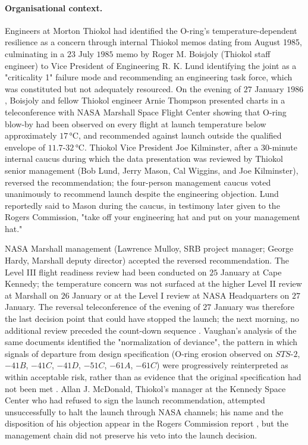\paragraph{Organisational context.}
Engineers at Morton Thiokol had identified the O-ring's
temperature-dependent resilience as a concern through internal
Thiokol memos dating from August 1985, culminating in a
$23$ July $1985$ memo by Roger M. Boisjoly (Thiokol staff
engineer) to Vice President of Engineering R. K. Lund identifying
the joint as a "criticality 1" failure mode and recommending an
engineering task force, which was constituted but not adequately
resourced. On the evening of $27$ January $1986$, Boisjoly and
fellow Thiokol engineer Arnie Thompson presented charts in a
teleconference with NASA Marshall Space Flight Center showing
that O-ring blow-by had been observed on every flight at launch
temperature below approximately $17\,\si{\degreeCelsius}$, and
recommended against launch outside the qualified envelope of
$11.7$-$32\,\si{\degreeCelsius}$. Thiokol Vice President Joe
Kilminster, after a $30$-minute internal caucus during which the
data presentation was reviewed by Thiokol senior management (Bob
Lund, Jerry Mason, Cal Wiggins, and Joe Kilminster), reversed the
recommendation; the four-person management caucus voted
unanimously to recommend launch despite the engineering
objection. Lund reportedly said to Mason during the caucus, in
testimony later given to the Rogers Commission, "take off your
engineering hat and put on your management hat."

NASA Marshall management (Lawrence Mulloy, SRB project manager;
George Hardy, Marshall deputy director) accepted the reversed
recommendation. The Level III flight readiness review had been
conducted on $25$ January at Cape Kennedy; the temperature
concern was not surfaced at the higher Level II review at
Marshall on $26$ January or at the Level I review at NASA
Headquarters on $27$ January. The reversal teleconference of the
evening of $27$ January was therefore the last decision point
that could have stopped the launch; the next morning, no
additional review preceded the count-down sequence
\cite{acc:nasa-challenger,hist:vaughan1996}. Vaughan's analysis
of the same documents identified the "normalization of deviance",
the pattern in which signals of departure from design
specification (O-ring erosion observed on $S T S$-$2$, $-41B$,
$-41C$, $-41D$, $-51C$, $-61A$, $-61C$) were progressively
reinterpreted as within acceptable risk, rather than as evidence
that the original specification had not been met
\cite{hist:vaughan1996}. Allan J. McDonald, Thiokol's manager at
the Kennedy Space Center who had refused to sign the launch
recommendation, attempted unsuccessfully to halt the launch
through NASA channels; his name and the disposition of his
objection appear in the Rogers Commission report
\cite{acc:nasa-challenger}, but the management chain did not
preserve his veto into the launch decision.

